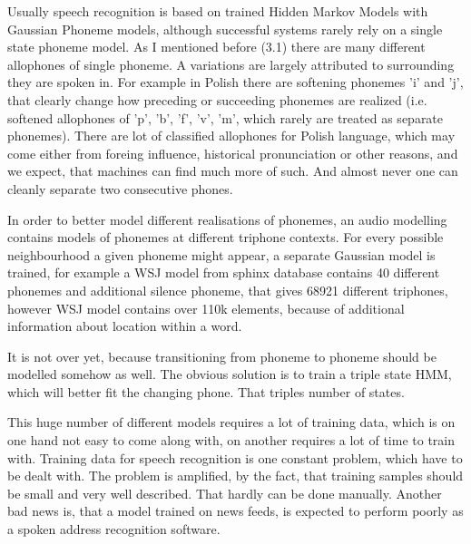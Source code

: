 \documentclass[12pt,a4paper,english]{article}
\begin{document}
Usually speech recognition is based on trained Hidden Markov Models with Gaussian Phoneme models, although successful systems rarely rely on a single state phoneme model. \newline
As I mentioned before (3.1) there are many different allophones of single phoneme. A variations are largely attributed to surrounding they are spoken in. For example in Polish there are softening phonemes 'i' and 'j', that clearly change how preceding or succeeding phonemes are realized (i.e. softened allophones of 'p', 'b', 'f', 'v', 'm', which rarely are treated as separate phonemes). There are lot of classified allophones for Polish language, which may come either from foreing influence, historical pronunciation or other reasons, and we expect, that machines can find much more of such. \newline
And almost never one can cleanly separate two consecutive phones. \newline

 In order to better model different realisations of phonemes, an audio modelling contains models of phonemes at different triphone contexts. 
For every possible neighbourhood a given phoneme might appear, a separate Gaussian model is trained, for example a WSJ model from sphinx database contains 40 different phonemes and additional silence phoneme, that gives 68921 different triphones, however WSJ model contains over 110k elements,  because of additional information about location within a word. \newline

It is not over yet, because transitioning from phoneme to phoneme should be modelled somehow as well. The obvious solution is to train a triple state HMM, which will better fit the changing phone. That triples number of states. \newline

This huge number of different models requires a lot of training data, which is on one hand not easy to come along with, on another requires a lot of time to train with. \newline
Training data for speech recognition is one constant problem, which have to be dealt with. The problem is amplified, by the fact, that training samples should be small and very well described. That hardly can be done manually. \newline
Another bad news is, that a model trained on news feeds, is expected to perform poorly as a spoken address recognition software. \newline
\end{document}
